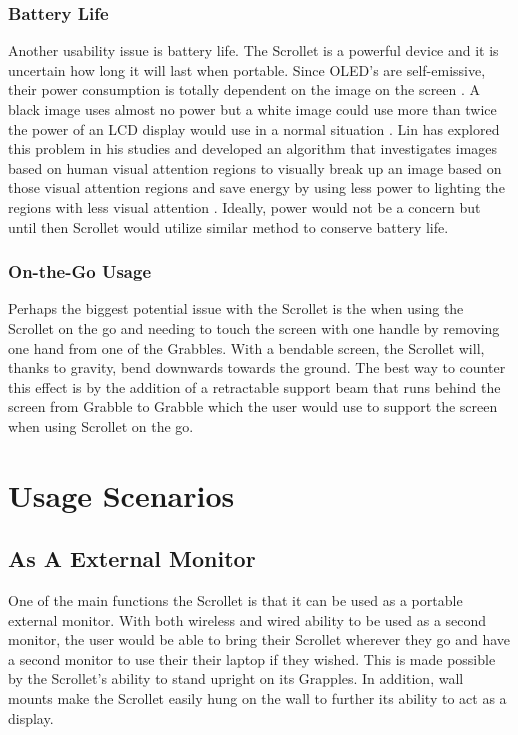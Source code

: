 \documentclass[a4paper]{article}
\begin{document}
\subsubsection{Battery Life}
Another usability issue is battery life. The Scrollet is a powerful device and it is uncertain how long it will last when portable. Since OLED's are self-emissive, their power consumption is totally dependent on the image on the screen \cite{Lin}. A black image uses almost no power but a white image could use more than twice the power of an LCD display would use in a normal situation \cite{Lin}. Lin has explored this problem in his studies and developed an algorithm that investigates images based on human visual attention regions to visually break up an image based on those visual attention regions and save energy by using less power to lighting the regions with less visual attention \cite{Lin}. Ideally, power would not be a concern but until then Scrollet would utilize similar method to conserve battery life.

\subsubsection{On-the-Go Usage}
Perhaps the biggest potential issue with the Scrollet is the when using the Scrollet on the go and needing to touch the screen with one handle by removing one hand from one of the Grabbles. With a bendable screen, the Scrollet will, thanks to gravity, bend downwards towards the ground. The best way to counter this effect is by the addition of a retractable support beam that runs behind the screen from Grabble to Grabble which the user would use to support the screen when using Scrollet on the go.

\section{Usage Scenarios}
\subsection{As A External Monitor}
One of the main functions the Scrollet is that it can be used as a portable external monitor. With both wireless and wired ability to be used as a second monitor, the user would be able to bring their Scrollet wherever they go and have a second monitor to use their their laptop if they wished. This is made possible by the Scrollet's ability to stand upright on its Grapples. In addition, wall mounts make the Scrollet easily hung on the wall to further its ability to act as a display.
\end{document}
